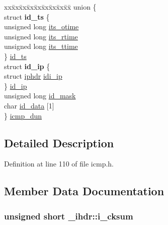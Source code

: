 \begin{DoxyCompactItemize}
\begin{tabbing}
\end{tabbing}\item 
\begin{tabbing}
xx\=xx\=xx\=xx\=xx\=xx\=xx\=xx\=xx\=\kill
union \{\\
\>struct {\bfseries id\_ts} \{\\
\>\>unsigned long \hyperlink{struct__ihdr_ab1bce9ee647c42e7cfde5e468a7efc68}{its\_otime}\\
\>\>unsigned long \hyperlink{struct__ihdr_aee743926bb7e5899d42114210be1f525}{its\_rtime}\\
\>\>unsigned long \hyperlink{struct__ihdr_a686540f5bc58f7930d80493be9e6d117}{its\_ttime}\\
\>\} \hyperlink{struct__ihdr_a6a07aaaa06386774c317c24db22830c9}{id\_ts}\\
\>struct {\bfseries id\_ip} \{\\
\>\>struct \hyperlink{structiphdr}{iphdr} \hyperlink{struct__ihdr_a01bc79c95db185a97826a8552fca8ada}{idi\_ip}\\
\>\} \hyperlink{struct__ihdr_a21dffa6f32fb5b82490caf254fa764c1}{id\_ip}\\
\>unsigned long \hyperlink{struct__ihdr_a098978c3369610c6662e4c8bcdff9040}{id\_mask}\\
\>char \hyperlink{struct__ihdr_a8d5a44990de5bfd7c92417f2b3b6c838}{id\_data} \mbox{[}1\mbox{]}\\
\} \hyperlink{struct__ihdr_a80f2308d90fe1041b6305207f7b2352d}{icmp\_dun}\\

\end{tabbing}\end{DoxyCompactItemize}


\subsection{\-Detailed \-Description}


\-Definition at line 110 of file icmp.\-h.



\subsection{\-Member \-Data \-Documentation}
\hypertarget{struct__ihdr_a57fae7fcc12a40ad4e9b745433523448}{
\subsubsection[{i\-\_\-cksum}]{\setlength{\rightskip}{0pt plus 5cm}unsigned short {\bf \-\_\-ihdr\-::i\-\_\-cksum}}}\label{struct__ihdr_a57fae7fcc12a40ad4e9b745433523448}


